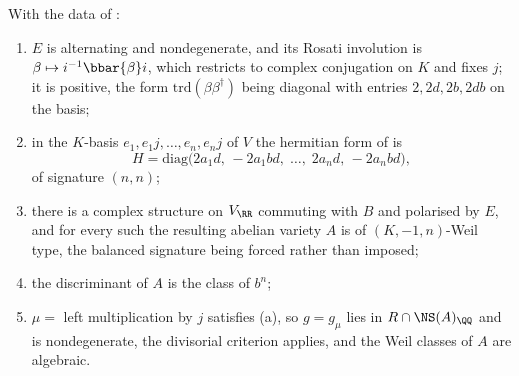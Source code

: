 \begin{theorem}\label{thm:quatweil}
With the data of :
\begin{enumerate}[label=\textup{(\roman*)},nosep]
\item $E$ is alternating and nondegenerate, and its Rosati involution is
  $\beta\mapsto i^{-1}\bbar{\beta}i$, which restricts to complex conjugation on
  $K$ and fixes $j$; it is positive, the form $\mathrm{trd}(\beta\beta^{\dagger})$
  being diagonal with entries $2,2d,2b,2db$ on the basis;
\item in the $K$-basis $e_{1},e_{1}j,\dots,e_{n},e_{n}j$ of $V$ the hermitian
  form of  is
  \[
    H=\mathrm{diag}\bigl(2a_{1}d,\,-2a_{1}bd,\;\dots,\;2a_{n}d,\,-2a_{n}bd\bigr),
  \]
  of signature $(n,n)$;
\item there is a complex structure on $V_{\RR}$ commuting with $B$ and
  polarised by $E$, and for every such the resulting abelian variety $A$ is of
  $(K,-1,n)$-Weil type, the balanced signature being forced rather than
  imposed;
\item the discriminant of $A$ is the class of $b^{n}$;
\item $\mu=$ left multiplication by $j$ satisfies (a),
  so $g=g_{\mu}$ lies in $R\cap\NS(A)_{\QQ}$ and is nondegenerate, the
  divisorial criterion  applies, and the Weil classes
  of $A$ are algebraic.
\end{enumerate}
\end{theorem}

